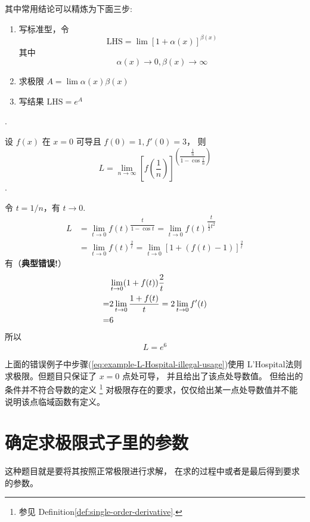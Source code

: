 其中常用结论可以精炼为下面三步:
\begin{enumerate}
	\item 写标准型，令
	\[\mbox{LHS} = \lim{} \left[ 1+\alpha(x)\right] ^{\beta(x)}\]
	其中 \[\alpha(x)\to0, \beta(x)\to\infty\]
	\item 求极限 $A = \lim \alpha(x)\beta(x)$
	\item 写结果 $\mbox{LHS} = e^{A}$
\end{enumerate}

\cite[question 30]{w660}.

\begin{example}
    \label{counter-example-of-usage-of-L-Hospital}
    设 $f(x)$ 在 $x = 0$ 可导且 $f(0) = 1, f'(0) = 3$，
    则
    \[
        L = \lim_{n \to \infty} {\left[
            f \left(\dfrac{1}{n}\right) 
        \right]}^{\left(\dfrac{\frac{1}{n}}{1 - \cos \frac{1}{n}} \right)}
    \]
    \cite[question 30]{w660}.

    令 $t = 1/n$，有 $t \to 0$.
    \begin{align*}
        L &= \lim_{t \to 0} {f(t)}^{\dfrac{t}{1 - \cos t}} 
          = \lim_{t \to 0} {f(t)}^{\dfrac{t}{\frac{1}{2} t^2}}\\
          &= \lim_{t \to 0} {f(t)}^{\frac{2}{t}} 
          = \lim_{t \to 0} {[1 + (f(t) - 1)]}^{\frac{2}{t}}
    \end{align*}
    有（\textbf{典型错误!}）
    \begin{align}
        &\lim_{t \to 0} (1+f(t)) \frac{2}{t} \notag \\
        = &2\lim_{t \to 0} \dfrac{1+ f(t)}{t} 
        = 2\lim_{t \to 0} {f'(t)} \label{eq:example-L-Hospital-illegal-usage}  \\
        = &6 \notag
    \end{align}
    所以
    \[
        L = e^{6}
    \]
\end{example}

上面的错误例子中步骤(\ref{eq:example-L-Hospital-illegal-usage})使用
L'Hospital法则求极限。但题目只保证了 $x = 0$ 点处可导，
并且给出了该点处导数值。 但给出的条件并不符合导数的定义
\footnote{参见 Definition\ref{def:single-order-derivative}.}
对极限存在的要求，仅仅给出某一点处导数值并不能说明该点临域函数有定义。

\section{确定求极限式子里的参数}

这种题目就是要将其按照正常极限进行求解，
在求的过程中或者是最后得到要求的参数。

